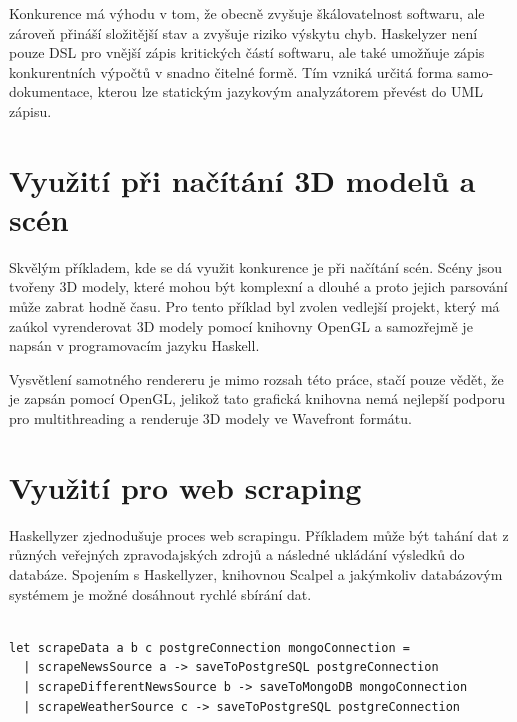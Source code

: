 \documentclass[male,czech]{kithesis}
\begin{document}
Konkurence má výhodu v tom, že obecně zvyšuje škálovatelnost softwaru, 
ale zároveň přináší složitější stav a zvyšuje riziko výskytu chyb. 
Haskelyzer není pouze DSL pro vnější zápis kritických částí softwaru, 
ale také umožňuje zápis konkurentních výpočtů v snadno čitelné formě. 
Tím vzniká určitá forma samo-dokumentace, 
kterou lze statickým jazykovým analyzátorem převést do UML zápisu.

\section{Využití při načítání 3D modelů a scén}

Skvělým příkladem, kde se dá využit konkurence je při načítání 
scén. Scény jsou tvořeny 3D modely, které mohou být komplexní a 
dlouhé a proto jejich parsování může zabrat hodně času. Pro 
tento příklad byl zvolen vedlejší projekt, který má zaúkol 
vyrenderovat 3D modely pomocí knihovny OpenGL a samozřejmě 
je napsán v programovacím jazyku Haskell.

Vysvětlení samotného rendereru je mimo rozsah této práce, stačí 
pouze vědět, že je zapsán pomocí OpenGL, jelikož tato grafická 
knihovna nemá nejlepší podporu pro multithreading a renderuje 
3D modely ve Wavefront formátu. 

\section{Využití pro web scraping}

Haskellyzer zjednodušuje proces web scrapingu. Příkladem může být tahání dat z různých veřejných
zpravodajských zdrojů a následné ukládání výsledků do databáze. Spojením s Haskellyzer, knihovnou 
Scalpel a jakýmkoliv databázovým systémem je možné dosáhnout rychlé sbírání dat.

\begin{verbatim}

let scrapeData a b c postgreConnection mongoConnection = 
  | scrapeNewsSource a -> saveToPostgreSQL postgreConnection
  | scrapeDifferentNewsSource b -> saveToMongoDB mongoConnection
  | scrapeWeatherSource c -> saveToPostgreSQL postgreConnection

\end{verbatim}
\end{document}
